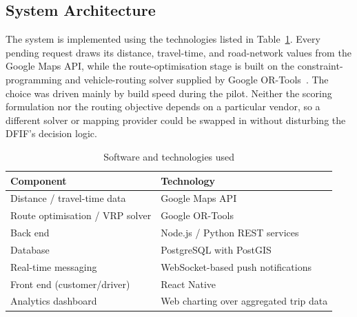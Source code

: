 \documentclass[conference]{IEEEtran}
\begin{document}
\subsection{System Architecture}
The system is implemented using the technologies listed in
Table~\ref{tab:stack}. Every pending request draws its distance, travel-time, and road-network
values from the Google Maps API, while the route-optimisation stage is built
on the constraint-programming and vehicle-routing solver supplied by Google
OR-Tools~\cite{ortools}. The choice was driven mainly by build speed during the pilot. Neither the
scoring formulation nor the routing objective depends on a particular vendor,
so a different solver or mapping provider could be swapped in without
disturbing the DFIF's decision logic.

\begin{table}[t]
\caption{Software and technologies used}
\label{tab:stack}
\centering
\footnotesize
\setlength{\tabcolsep}{5pt}
\begin{tabular}{@{}ll@{}}
\toprule
Component & Technology \\
\midrule
Distance / travel-time data & Google Maps API \\
Route optimisation / VRP solver & Google OR-Tools \\
Back end & Node.js / Python REST services \\
Database & PostgreSQL with PostGIS \\
Real-time messaging & WebSocket-based push notifications \\
Front end (customer/driver) & React Native \\
Analytics dashboard & Web charting over aggregated trip data \\
\bottomrule
\end{tabular}
\end{table}
\end{document}
